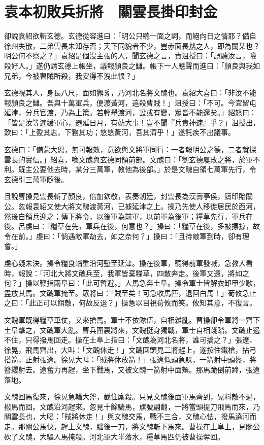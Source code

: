 
\chapter{袁本初敗兵折將　關雲長掛印封金}

卻說袁紹欲斬玄德。玄德從容進曰：「明公只聽一面之詞，而絕向日之情耶？備自徐州失散，二弟雲長未知存否；天下同貌者不少，豈赤面長鬚之人，即為關某也？明公何不察之？」袁紹是個沒主張的人，聞玄德之言，責沮授曰：「誤聽汝言，險殺好人。」遂仍請玄德上帳坐，議報顏良之讎。帳下一人應聲而進曰：「顏良與我如兄弟，今被曹賊所殺，我安得不洩此恨？」

玄德視其人，身長八尺，面如獬豸，乃河北名將文醜也。袁紹大喜曰：「非汝不能報顏良之讎。吾與十萬軍兵，便渡黃河，追殺曹賊！」沮授曰：「不可。今宜留屯延津，分兵官渡，乃為上策。若輕舉渡河，設或有變，眾皆不能還矣。」紹怒曰：「皆是汝等遲緩軍心，遷延日月，有妨大事！豈不聞『兵貴神速』乎？」沮授出，歎曰：「上盈其志，下務其功；悠悠黃河，吾其濟乎！」遂託疾不出議事。

玄德曰：「備蒙大恩，無可報效，意欲與文將軍同行：一者報明公之德，二者就探雲長的實信。」紹喜，喚文醜與玄德同領前部。文醜曰：「劉玄德屢敗之將，於軍不利。既主公要他去時，某分三萬軍，教他為後部。」於是文醜自領七萬軍先行，令玄德引三萬軍隨後。

且說曹操見雲長斬了顏良，倍加欽敬，表奏朝廷，封雲長為漢壽亭侯，鑄印貽關公。忽報袁紹又使大將文醜渡黃河，已據延津之上。操乃先使人移徙居民於西河，然後自領兵迎之；傳下將令，以後軍為前軍，以前軍為後軍；糧草先行，軍兵在後。呂虔曰：「糧草在先，軍兵在後，何意也？」操曰：「糧草在後，多被摽掠，故令在前。」虔曰：「倘遇敵軍劫去，如之奈何？」操曰：「且待敵軍到時，卻有理會。」

虔心疑未決。操令糧食輜重沿河塹至延津。操在後軍，聽得前軍發喊，急教人看時，報說：「河北大將文醜兵至，我軍皆棄糧草，四散奔走。後軍又遠，將如之何？」操以鞭指兩阜曰：「此可暫避。」人馬急奔土阜。操令軍士皆解衣卸甲少歇，盡放其馬。文醜軍掩至。眾將曰：「賊至矣！可急收馬匹，退回白馬！」荀攸急止之曰：「此正可以餌敵，何故反退？」操急以目視荀攸而笑。攸知其意，不復言。

文醜軍既得糧草車仗，又來搶馬。軍士不依隊伍，自相雜亂。曹操卻令軍將一齊下土阜擊之，文醜軍大亂。曹兵圍裏將來，文醜挺身獨戰，軍士自相踐踏。文醜止遏不住，只得撥馬回走。操在土阜上指曰：「文醜為河北名將，誰可擒之？」張遼、徐晃，飛馬齊出，大叫：「文醜休走！」文醜回頭見二將趕上，遂按住鐵槍，拈弓搭箭，正射張遼。徐晃大叫：「賊將休放箭！」張遼低頭急躲，一箭射中頭盔，將簪纓射去。遼奮力再趕，坐下戰馬，又被文醜一箭射中面頰。那馬跪倒前蹄，張遼落地。

文醜回馬復來，徐晃急輪大斧，截住廝殺。只見文醜後面軍馬齊到，晃料敵不過，撥馬而回。文醜沿河趕來。忽見十餘騎馬，旗號翩翻，一將當頭提刀飛馬而來，乃關雲長也，大喝：「賊將休走！」與文醜交馬，戰不三合，文醜心怯，撥馬遶河而走。那關公馬快，趕上文醜，腦後一刀，將文醜斬下馬來。曹操在土阜上，見關公砍了文醜，大驅人馬掩殺。河北軍大半落水，糧草馬匹仍被曹操奪回。

